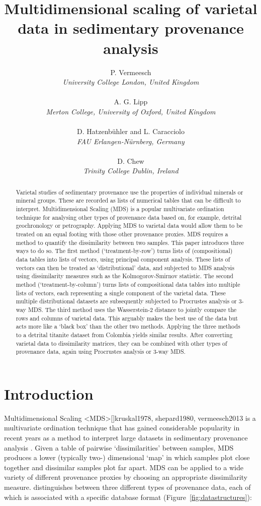 \documentclass{article}
\title{Multidimensional scaling of varietal data in sedimentary provenance analysis}
\author{P. Vermeesch\\\emph{University College London, United Kingdom}\\\\
  A. G. Lipp\\\emph{Merton College, University of Oxford, United Kingdom}\\\\
  D. Hatzenb\"{u}hler and L. Caracciolo\\\emph{FAU Erlangen-N\"{u}rnberg, Germany}\\\\
  D. Chew\\\emph{Trinity College Dublin, Ireland}
}
\date{}
\begin{document}
\maketitle

\begin{abstract}
Varietal studies of sedimentary provenance use the properties of
individual minerals or mineral groups. These are recorded as lists of
numerical tables that can be difficult to interpret. Multidimensional
Scaling (MDS) is a popular multivariate ordination technique for
analysing other types of provenance data based on, for example,
detrital geochronology or petrography.  Applying MDS to varietal data
would allow them to be treated on an equal footing with those other
provenance proxies. MDS requires a method to quantify the
dissimilarity between two samples. This paper introduces three ways to
do so. The first method (`treatment-by-row') turns lists of
(compositional) data tables into lists of vectors, using principal
component analysis. These lists of vectors can then be treated as
`distributional' data, and subjected to MDS analysis using
dissimilarity measures such as the Kolmogorov-Smirnov statistic.  The
second method (`treatment-by-column') turns lists of compositional
data tables into multiple lists of vectors, each representing a single
component of the varietal data. These multiple distributional datasets
are subsequently subjected to Procrustes analysis or 3-way MDS. The
third method uses the Wasserstein-2 distance to jointly compare the
rows and columns of varietal data. This arguably makes the best use of
the data but acts more like a `black box' than the other two
methods. Applying the three methods to a detrital titanite dataset
from Colombia yields similar results. After converting varietal data
to dissimilarity matrices, they can be combined with other types of
provenance data, again using Procrustes analysis or 3-way MDS.
\end{abstract}

\section{Introduction}\label{sec:intro}

Multidimensional Scaling \citeA<MDS>[]{kruskal1978, shepard1980,
  vermeesch2013} is a multivariate ordination technique that has
gained considerable popularity in recent years as a method to
interpret large datasets in sedimentary provenance analysis
\cite{vermeesch2013}. Given a table of pairwise `dissimilarities'
between samples, MDS produces a lower (typically two-) dimensional
`map' in which samples plot close together and dissimilar samples plot
far apart. MDS can be applied to a wide variety of different
provenance proxies by choosing an appropriate dissimilarity measure.
 distinguishes between three different types of
provenance data, each of which is associated with a specific database
format (Figure~\ref{fig:datastructures}):
\end{document}
